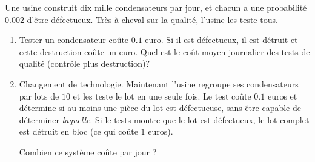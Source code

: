 
\begin{exercice}\label{exosmath-0023}

    Une usine construit dix mille condensateurs par jour, et chacun a une probabilité \( 0.002\) d'être défectueux. Très à cheval sur la qualité, l'usine les teste tous.
    \begin{enumerate}
        \item
            Tester un condensateur coûte \( 0.1\) euro. Si il est défectueux, il est détruit et cette destruction coûte un euro. Quel est le coût moyen journalier des tests de qualité (contrôle plus destruction)? 
        \item
            Changement de technologie. Maintenant l'usine regroupe ses condensateurs par lots de \( 10\) et les teste le lot en une seule fois. Le test coûte \( 0.1\) euros et détermine si au moins une pièce du lot est défectueuse, sans être capable de déterminer \emph{laquelle}. Si le tests montre que le lot est défectueux, le lot complet est détruit en bloc (ce qui coûte \( 1\) euros).

            Combien ce système coûte par jour ?
    \end{enumerate}

\end{exercice}
